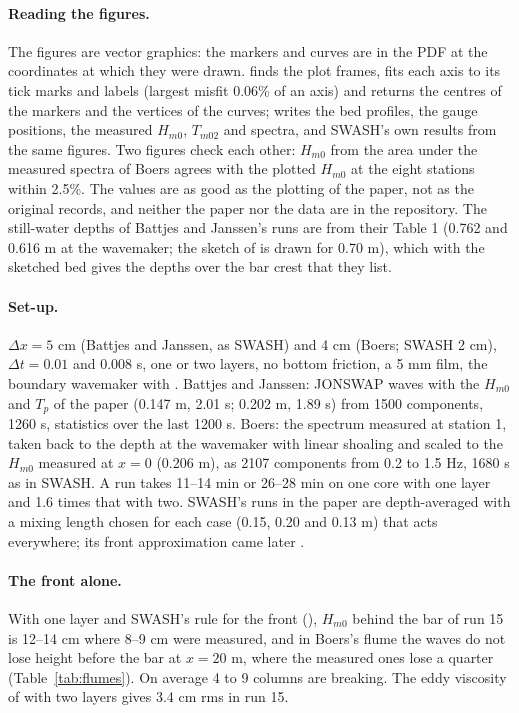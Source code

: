 \paragraph{Reading the figures.} The figures are vector graphics: the
markers and curves are in the PDF at the coordinates at which they were
drawn.  finds the plot frames, fits each axis to
its tick marks and labels (largest misfit 0.06\% of an axis) and returns
the centres of the markers and the vertices of the curves;
 writes the bed profiles, the gauge
positions, the measured $H_{m0}$, $T_{m02}$ and spectra, and SWASH's own
results from the same figures. Two figures check each other: $H_{m0}$ from
the area under the measured spectra of Boers agrees with the plotted
$H_{m0}$ at the eight stations within 2.5\%. The values are as good as the
plotting of the paper, not as the original records, and neither the paper
nor the data are in the repository. The still-water depths of Battjes and
Janssen's runs are from their Table 1 (0.762 and 0.616 m at the wavemaker;
the sketch of \citet{zijlema2011} is drawn for 0.70 m), which with the
sketched bed gives the depths over the bar crest that they list.

\paragraph{Set-up.} $\Delta x = 5$ cm (Battjes and Janssen, as SWASH) and
4 cm (Boers; SWASH 2 cm), $\Delta t = 0.01$ and 0.008 s, one or two layers,
no bottom friction, a 5 mm film, the boundary wavemaker with
. Battjes and Janssen: JONSWAP waves with the $H_{m0}$
and $T_p$ of the paper (0.147 m, 2.01 s; 0.202 m, 1.89 s) from 1500
components, 1260 s, statistics over the last 1200 s. Boers: the spectrum
measured at station 1, taken back to the depth at the wavemaker with linear
shoaling and scaled to the $H_{m0}$ measured at $x = 0$ (0.206 m), as 2107
components from 0.2 to 1.5 Hz, 1680 s as in SWASH. A run takes 11--14 min
or 26--28 min on one core with one layer and 1.6 times that with two.
SWASH's runs in the paper are depth-averaged with a mixing length chosen
for each case (0.15, 0.20 and 0.13 m) that acts everywhere; its front
approximation came later \citep{smit2013}.

\paragraph{The front alone.} With one layer and SWASH's rule for the front
(), $H_{m0}$ behind the bar of run 15 is 12--14 cm
where 8--9 cm were measured, and in Boers's flume the waves do not lose
height before the bar at $x = 20$ m, where the measured ones lose a quarter
(Table~\ref{tab:flumes}). On average 4 to 9 columns are breaking. The eddy
viscosity of \citet{kennedy2000} with two layers gives 3.4 cm rms in run
15.

